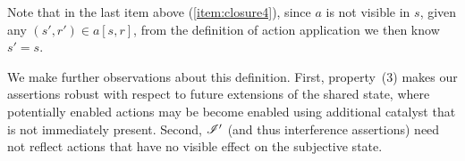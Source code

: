 Note that in the last item above (\ref{item:closure4}), since $a$ is not visible in $s$, given any $(s', r') \in a[s, r]$, from the definition of action application we then know $s' = s$. 





We make further observations about this definition. First, property~(3) makes our assertions robust with respect to future extensions of the shared state, where potentially enabled actions may be become enabled using additional catalyst that is not immediately present. Second, $\mathscr{I}'$ (and thus interference assertions) need not reflect actions that have no visible effect on the subjective state.\\

